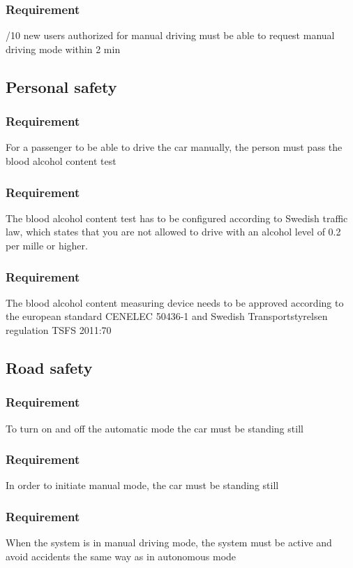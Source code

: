 \documentclass{article}
\begin{document}
{      \subsubsection{Requirement}
\hfill \break 
\- \- /10 new users authorized for manual driving must be able to request manual driving mode within 2 min
  \subsection{Personal safety}
      \subsubsection{Requirement}
\hfill \break 
\- \- \-For a passenger to be able to drive the car manually, the person must pass the blood alcohol content test
      \subsubsection{Requirement}
\hfill \break 
\- \- \-The blood alcohol content test has to be configured according to Swedish traffic law, which states that you are not allowed to drive with an alcohol level of 0.2 per mille or higher.
      \subsubsection{Requirement}
\hfill \break 
\- \- \-The blood alcohol content measuring device needs to be approved according to the european standard CENELEC 50436-1 and Swedish Transportstyrelsen regulation TSFS 2011:70
  \subsection{Road safety}
      \subsubsection{Requirement}
\hfill \break 
\- \- \-To turn on and off the automatic mode the car must be standing still
      \subsubsection{Requirement}
\hfill \break 
\- \- \-In order to initiate manual mode, the car must be standing still
      \subsubsection{Requirement}
\hfill \break 
\- \- \-When the system is in manual driving mode, the system must be active and avoid accidents the same way as in autonomous mode
}
\end{document}
